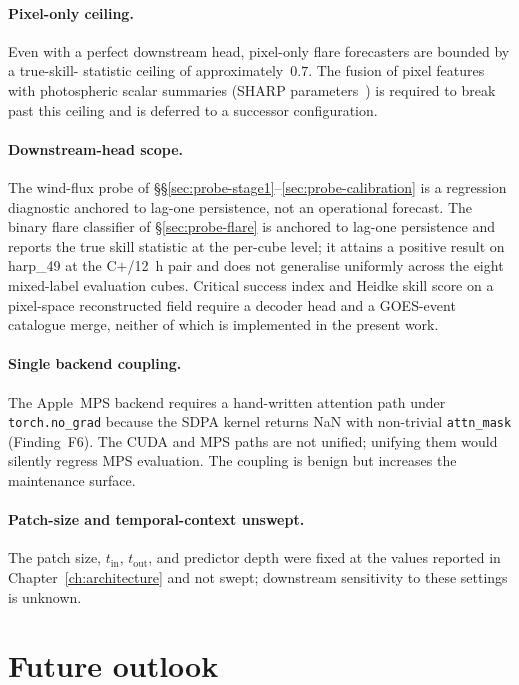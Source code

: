 \paragraph{Pixel-only ceiling.} Even with a perfect downstream
head, pixel-only flare forecasters are bounded by a true-skill-
statistic ceiling of approximately~$0.7$. The fusion of pixel
features with photospheric scalar summaries (SHARP
parameters~\cite{bobra2014sharp}) is required to break past this
ceiling and is deferred to a successor configuration.

\paragraph{Downstream-head scope.} The wind-flux probe of
\S\S\ref{sec:probe-stage1}--\ref{sec:probe-calibration} is a
regression diagnostic anchored to lag-one persistence, not an
operational forecast. The binary flare classifier of
\S\ref{sec:probe-flare} is anchored to lag-one persistence and
reports the true skill statistic at the per-cube level; it
attains a positive result on harp\_49 at the C$+$/12~h pair and
does not generalise uniformly across the eight mixed-label
evaluation cubes. Critical success index and Heidke skill score
on a pixel-space reconstructed field require a decoder head and
a GOES-event catalogue merge, neither of which is implemented in
the present work.

\paragraph{Single backend coupling.} The Apple~MPS backend
requires a hand-written attention path under
\texttt{torch.no\_grad} because the SDPA kernel returns NaN with
non-trivial \texttt{attn\_mask} (Finding~F6). The CUDA and MPS
paths are not unified; unifying them would silently regress MPS
evaluation. The coupling is benign but increases the maintenance
surface.

\paragraph{Patch-size and temporal-context unswept.} The patch
size, $t_{\text{in}}$, $t_{\text{out}}$, and predictor depth were
fixed at the values reported in Chapter~\ref{ch:architecture} and
not swept; downstream sensitivity to these settings is unknown.

\section{Future outlook}
\label{sec:sum-future}

